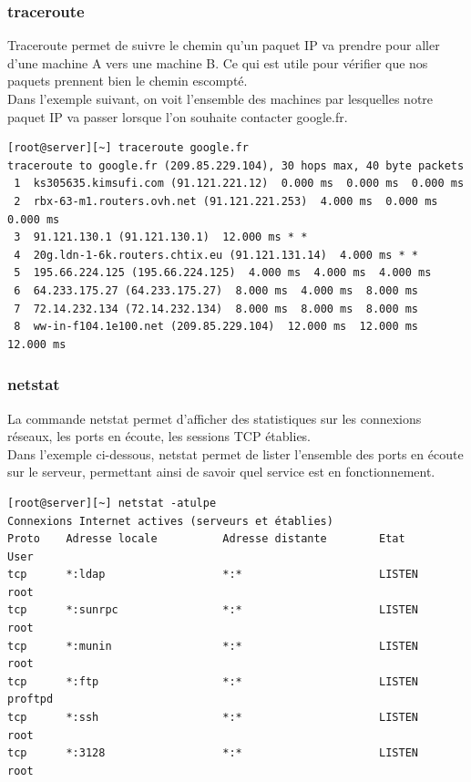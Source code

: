 \documentclass[a4paper,12pt]{article}
\begin{document}
\subsubsection{traceroute}

Traceroute permet de suivre le chemin qu'un paquet IP va prendre pour aller d'une machine A vers une machine B. Ce qui est utile pour vérifier que nos paquets prennent bien le chemin escompté. \\

Dans l'exemple suivant, on voit l'ensemble des machines par lesquelles notre paquet IP va passer lorsque l'on souhaite contacter google.fr.



{\footnotesize \begin{verbatim}
[root@server][~] traceroute google.fr
traceroute to google.fr (209.85.229.104), 30 hops max, 40 byte packets
 1  ks305635.kimsufi.com (91.121.221.12)  0.000 ms  0.000 ms  0.000 ms
 2  rbx-63-m1.routers.ovh.net (91.121.221.253)  4.000 ms  0.000 ms  0.000 ms
 3  91.121.130.1 (91.121.130.1)  12.000 ms * *
 4  20g.ldn-1-6k.routers.chtix.eu (91.121.131.14)  4.000 ms * *
 5  195.66.224.125 (195.66.224.125)  4.000 ms  4.000 ms  4.000 ms
 6  64.233.175.27 (64.233.175.27)  8.000 ms  4.000 ms  8.000 ms
 7  72.14.232.134 (72.14.232.134)  8.000 ms  8.000 ms  8.000 ms
 8  ww-in-f104.1e100.net (209.85.229.104)  12.000 ms  12.000 ms  12.000 ms
\end{verbatim}}

\subsubsection{netstat}

La commande netstat permet d'afficher des statistiques sur les connexions réseaux, les ports en écoute, les sessions TCP établies.\\

Dans l'exemple ci-dessous, netstat permet de lister l'ensemble des ports en écoute sur le serveur, permettant ainsi de savoir quel service est en fonctionnement.
{\footnotesize \begin{verbatim}
[root@server][~] netstat -atulpe
Connexions Internet actives (serveurs et établies)
Proto    Adresse locale          Adresse distante        Etat        User     
tcp      *:ldap                  *:*                     LISTEN      root                 
tcp      *:sunrpc                *:*                     LISTEN      root        
tcp      *:munin                 *:*                     LISTEN      root      
tcp      *:ftp                   *:*                     LISTEN      proftpd    
tcp      *:ssh                   *:*                     LISTEN      root         
tcp      *:3128                  *:*                     LISTEN      root          
\end{verbatim}}
\end{document}
